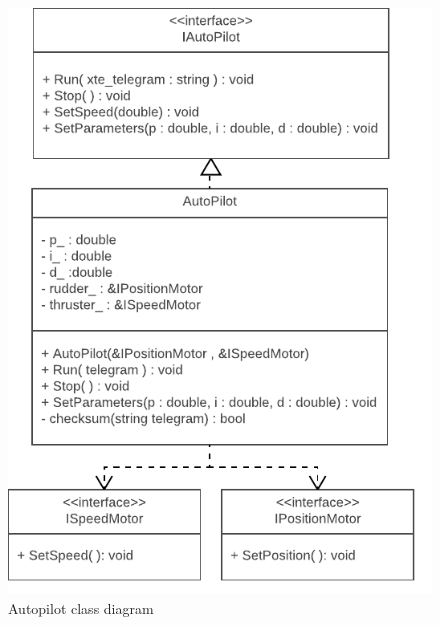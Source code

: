 \begin{figure}[H]
\centering
\includegraphics[max width=1\linewidth]{Autopilot_class_diagram}
\caption{Autopilot class diagram}
\label{fig:Autopilot}
\end{figure}